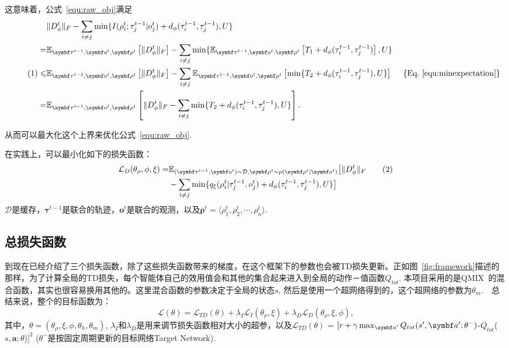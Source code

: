 这意味着，公式~\ref{equ:raw_obj}满足
\begin{align*}
    &\|D_\phi^t\|_{F} - \sum_{i\ne j}\min\{I(\rho^{t}_i; \tau^{t-1}_j|o^t_j) + d_\phi(\tau^{t-1}_i, \tau^{t-1}_j), U\} \\
  = & \mathbb{E}_{\bm{\tau}^{t-1}, \bm{o}^t, \bm{\rho}^t}\left[\|D_\phi^t\|_{F}\right] - \sum_{i\ne j}\min \{ \mathbb{E}_{\bm{\tau}^{t-1}, \bm{o}^t, \bm{\rho}^t}\left[T_1+d_\phi(\tau^{t-1}_i, \tau^{t-1}_j)\right], U\}\\ \stepcounter{equation}\tag{\theequation}\label{equ:specialized_math_lower_bound}
  \le & \mathbb{E}_{\bm{\tau}^{t-1}, \bm{o}^t, \bm{\rho}^t}\left[\|D_\phi^t\|_{F}\right] - \sum_{i\ne j}\mathbb{E}_{\bm{\tau}^{t-1}, \bm{o}^t, \bm{\rho}^t}\left[\min \{ T_2+d_\phi(\tau^{t-1}_i, \tau^{t-1}_j), U\}\right] \ \ \ \ \{\text{Eq.~\ref{equ:minexpectation}}\}\\
  = & \mathbb{E}_{\bm{\tau}^{t-1}, \bm{o}^t, \bm{\rho}^t}\left[\|D_\phi^t\|_{F} - \sum_{i\ne j}\min \{ T_2+d_\phi(\tau^{t-1}_i, \tau^{t-1}_j), U\}\right].
\end{align*}

从而可以最大化这个上界来优化公式~\ref{equ:raw_obj}. 

在实践上，可以最小化如下的损失函数：
\begin{align*}
    \mathcal{L}_D(\theta_\rho, \phi, \xi) = &\mathbb{E}_{(\bm{\tau}^{t-1}, \bm{o}^t)\sim\mathcal{D}, \bm{\rho}^t\sim p(\bm{\rho}^t | \bm{o}^t)}\big[\|D_\phi^t\|_{F} \stepcounter{equation}\tag{\theequation} \\ 
        & - \sum_{i\ne j}\min\{q_\xi(\rho^{t}_i| \tau^{t-1}_j, o^t_j) + d_\phi(\tau^{t-1}_i, \tau^{t-1}_j), U\}\big]
\end{align*}
$\mathcal{D}$是缓存，$\bm{\tau}^{t-1}$是联合的轨迹，$\bm{o}^{t}$是联合的观测，以及$\bm{\rho}^{t}=\langle \rho_1^t, \rho_2^t, \cdots, \rho_n^t\rangle$.

\subsection{总损失函数}
到现在已经介绍了三个损失函数，除了这些损失函数带来的梯度，在这个框架下的参数也会被TD损失更新。正如图~\ref{fig:framework}描述的那样，为了计算全局的TD损失，每个智能体自己的效用值会和其他的集合起来进入到全局的动作－值函数$Q_{tot}$. 本项目采用的是QMIX~\cite{rashid2018qmix}的混合函数，其实也很容易换用其他的。这里混合函数的参数决定于全局的状态$s$, 然后是使用一个超网络得到的，这个超网络的参数为$\theta_m$.　总结来说，整个的目标函数为：
\begin{equation}
    \mathcal{L}(\theta) = \mathcal{L}_{TD}(\theta) +\lambda_I\mathcal{L}_I(\theta_\rho, \xi) + \lambda_D\mathcal{L}_D(\theta_\rho, \xi, \phi),
\end{equation}
其中，$\theta=(\theta_\rho, \xi, \phi, \theta_h, \theta_m)$, $\lambda_I$和$\lambda_D$是用来调节损失函数相对大小的超参，以及$\mathcal{L}_{TD}(\theta)$ = $[r + \gamma \max_{\va'} Q_{tot}(s', \bm{a'}; \theta^-)$-$Q_{tot}$($s, \bm{a}; \theta$)$]^2$ ($\theta^-$是按固定周期更新的目标网络Target Network).

